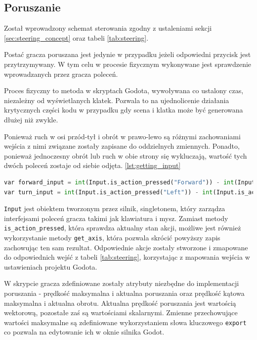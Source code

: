 \subsection{Poruszanie}
Został wprowadzony schemat sterowania zgodny z ustaleniami sekcji \ref{sec:steering_concept} oraz tabeli \ref{tab:steering}. 

Postać gracza poruszana jest jedynie w przypadku jeżeli odpowiedni przycisk jest przytrzymywany. W tym celu w procesie fizycznym wykonywane jest sprawdzenie wprowadzanych przez gracza poleceń. 

Proces fizyczny to metoda w skryptach Godota, wywoływana co ustalony czas, niezależny od wyświetlanych klatek. Pozwala to na ujednolicenie działania krytycznych części kodu w przypadku gdy scena i klatka może być generowana dłużej niż zwykle.

Ponieważ ruch w osi przód-tył i obrót w prawo-lewo są różnymi zachowaniami wejścia z nimi związane zostały zapisane do oddzielnych zmiennych. Ponadto, ponieważ jednoczesny obrót lub ruch w obie strony się wykluczają, wartość tych dwóch poleceń zostaje od siebie odjęta. \ref{lst:getting_input}

\begin{lstlisting}[language=python,caption=Kod pobierający polecenia gracza, label=lst:getting_input,basicstyle=\footnotesize\ttfamily]
var forward_input = int(Input.is_action_pressed("Forward")) - int(Input.is_action_pressed("Back"))
var turn_input = int(Input.is_action_pressed("Left")) - int(Input.is_action_pressed("Right"))
\end{lstlisting}

\texttt{Input} jest obiektem tworzonym przez silnik, singletonem, który zarządza interfejsami poleceń gracza takimi jak klawiatura i mysz. Zamiast metody \texttt{is\_action\_pressed}, która sprawdza aktualny stan akcji, możliwe jest również wykorzystanie metody \texttt{get\_axis}, która pozwala skrócić powyższy zapis zachowując ten sam rezultat. Odpowiednie akcje zostały stworzone i zmapowane do odpowiednich wejść z tabeli \ref{tab:steering}, korzystając z mapowania wejścia w ustawieniach projektu Godota.

W skrypcie gracza zdefiniowane zostały atrybuty niezbędne do implementacji poruszania - prędkość maksymalna i aktualna poruszania oraz prędkość kątowa maksymalna i aktualna obrotu. Aktualna prędkość poruszania jest wartością wektorową, pozostałe zaś są wartościami skalarnymi. Zmienne przechowujące wartości maksymalne są zdefiniowane wykorzystaniem słowa kluczowego \texttt{export} co pozwala na edytowanie ich w oknie silnika Godot.


